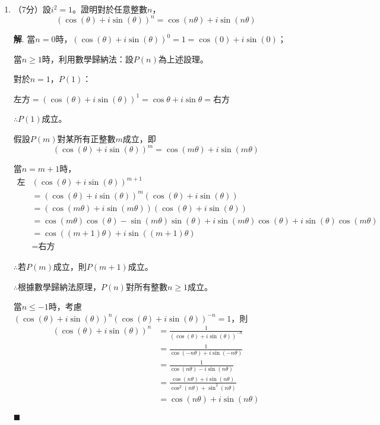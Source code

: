 \documentclass[12pt]{article}
\newenvironment*{sol}{\par \textbf{解}.}{\hfill$\blacksquare$}
\begin{document}
    \begin{enumerate}
        \item （7分）設$i^2=1$。證明對於任意整數$n$，$$(\cos(\theta)+i\sin(\theta))^n=\cos(n\theta)+i\sin(n\theta)$$\begin{sol}
            當$n=0$時，$(\cos(\theta)+i\sin(\theta))^0=1=\cos(0)+i\sin(0)$；

            當$n\geq 1$時，利用數學歸納法：設$P(n)$為上述設理。

            對於$n=1$，$P(1)$：

            左方$=(\cos(\theta)+i\sin(\theta))^1=\cos{\theta}+i\sin{\theta}=$右方

            $\therefore P(1)$成立。

            假設$P(m)$對某所有正整數$m$成立，即$$(\cos(\theta)+i\sin(\theta))^m=\cos(m\theta)+i\sin(m\theta)$$

            當$n=m+1$時，\begin{align*}
                \textrm{左方}&(\cos(\theta)+i\sin(\theta))^{m+1}\\
                &=(\cos(\theta)+i\sin(\theta))^m(\cos(\theta)+i\sin(\theta))\\
                &=(\cos(m\theta)+i\sin(m\theta))(\cos(\theta)+i\sin(\theta))\\
                &=\cos(m\theta)\cos(\theta)-\sin(m\theta)\sin(\theta)+i\sin(m\theta)\cos(\theta)+i\sin(\theta)\cos(m\theta)\\
                &=\cos((m+1)\theta)+i\sin((m+1)\theta)\\
                &=\textrm{右方}
            \end{align*}

            $\therefore$若$P(m)$成立，則$P(m+1)$成立。

            $\therefore$根據數學歸納法原理，$P(n)$對所有整數$n\geq 1$成立。

            當$n\leq -1$時，考慮$(\cos(\theta)+i\sin(\theta))^n(\cos(\theta)+i\sin(\theta))^{-n}=1$，則\begin{align*}
                (\cos(\theta)+i\sin(\theta))^n&=\frac{1}{(\cos(\theta)+i\sin(\theta))^{-n}}\\
                &=\frac{1}{\cos(-n\theta)+i\sin(-n\theta)}\\
                &=\frac{1}{\cos(n\theta)-i\sin(n\theta)}\\
                &=\frac{\cos(n\theta)+i\sin(n\theta)}{\cos^2(n\theta)+\sin^2(n\theta)}\\
                &=\cos(n\theta)+i\sin(n\theta)
            \end{align*}


\end{sol}
\end{enumerate}
\end{document}
